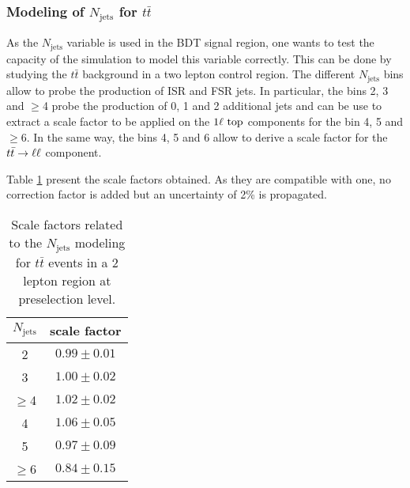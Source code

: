             \subsubsection{Modeling of $N_\text{jets}$ for $t\bar{t}$}

            As the $N_\text{jets}$ variable is used in the BDT signal region, one wants to test the
            capacity of the simulation to model this variable correctly. This can be done by
            studying the $t\bar{t}$ background in a two lepton control region. The different
            $N_\text{jets}$ bins allow to probe the production of ISR and FSR jets. In particular,
            the bins 2, 3 and $\geq$4 probe the production of 0, 1 and 2 additional jets and
            can be use to extract a scale factor to be applied on the $1\ell~\text{top}$ components
            for the bin 4, 5 and $\geq$6. In the same way, the bins 4, 5 and 6 allow to derive
            a scale factor for the $t\bar{t} \rightarrow \ell \ell$ component. 
            
            Table \ref{tab:NjetsModeling} present the scale factors obtained. As they are compatible
            with one, no correction factor is added but an uncertainty of 2\% is propagated.

            \begin{table}
                \centering
                \begin{tabular}{|c|c|}
                    \hline
                   $N_\text{jets}$ & scale factor \\
                    \hline
                    2              & $0.99 \pm 0.01$ \\
                    3              & $1.00 \pm 0.02$ \\
                    $\geq$4        & $1.02 \pm 0.02$ \\
                    \hline          
                    4              & $1.06 \pm 0.05$ \\
                    5              & $0.97 \pm 0.09$ \\
                    $\geq$6        & $0.84 \pm 0.15$ \\
                    \hline
                \end{tabular}
                \caption{Scale factors related to the $N_\text{jets}$ modeling for 
                $t\bar{t}$ events in a 2 lepton region at preselection level.}
                \label{tab:NjetsModeling}
            \end{table}

